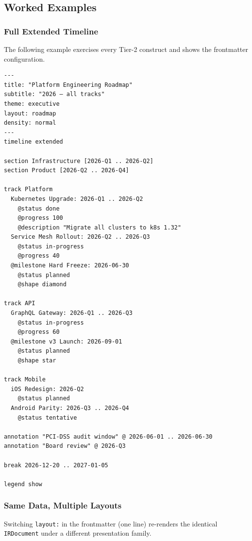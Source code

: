 \subsection{Worked Examples}
\label{sec:et-examples}

\subsubsection{Full Extended Timeline}

The following example exercises every Tier-2 construct and shows the
frontmatter configuration.

\begin{lstlisting}[caption={Full extended timeline source}]
---
title: "Platform Engineering Roadmap"
subtitle: "2026 — all tracks"
theme: executive
layout: roadmap
density: normal
---
timeline extended

section Infrastructure [2026-Q1 .. 2026-Q2]
section Product [2026-Q2 .. 2026-Q4]

track Platform
  Kubernetes Upgrade: 2026-Q1 .. 2026-Q2
    @status done
    @progress 100
    @description "Migrate all clusters to k8s 1.32"
  Service Mesh Rollout: 2026-Q2 .. 2026-Q3
    @status in-progress
    @progress 40
  @milestone Hard Freeze: 2026-06-30
    @status planned
    @shape diamond

track API
  GraphQL Gateway: 2026-Q1 .. 2026-Q3
    @status in-progress
    @progress 60
  @milestone v3 Launch: 2026-09-01
    @status planned
    @shape star

track Mobile
  iOS Redesign: 2026-Q2
    @status planned
  Android Parity: 2026-Q3 .. 2026-Q4
    @status tentative

annotation "PCI-DSS audit window" @ 2026-06-01 .. 2026-06-30
annotation "Board review" @ 2026-Q3

break 2026-12-20 .. 2027-01-05

legend show
\end{lstlisting}

\subsubsection{Same Data, Multiple Layouts}

Switching \texttt{layout:} in the frontmatter (one line) re-renders the
identical \texttt{IRDocument} under a different presentation family.

